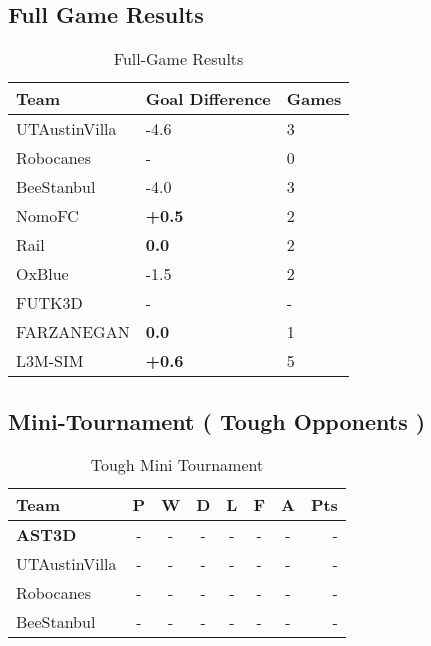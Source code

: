 \subsection{Full Game Results}

\begin{table}
\begin{center}
    \begin{tabular}{ | l | l | l | }
    \hline
    Team & Goal Difference & Games   \\ \hline
    UTAustinVilla 	& -4.6 					& 3 			\\ \hline	
    Robocanes 		& -						& 0 			\\ \hline
    BeeStanbul		& -4.0					& 3				\\ \hline
    NomoFC 			& \textbf{+0.5} 		& 2 			\\ \hline
    Rail 			& \textbf{0.0} 			& 2 			\\ \hline
    OxBlue 			& -1.5 					& 2 			\\ \hline
    FUTK3D 			& - 					& - 			\\ \hline
    FARZANEGAN 		& \textbf{0.0} 			& 1 			\\ \hline
    L3M-SIM			& \textbf{+0.6} 		& 5 			\\     
    \hline
    \end{tabular}
\end{center}
\label{GameResults}
\caption{Full-Game Results}
\end{table}

\subsection{Mini-Tournament ( Tough Opponents )}
\begin{table}
\begin{center}
\begin{tabular}{l*{6}{c}r}
Team              & P & W & D & L & F  & A & Pts \\ \hline
\textbf{AST3D} 	  & - & - & - & - & -  & - & -  \\
UTAustinVilla     & - & - & - & - &  - & - & -  \\
Robocanes         & - & - & - & - &  - & - & -  \\
BeeStanbul     	  & - & - & - & - &  - & - & -  \\
\end{tabular}
\end{center}
\label{ToughTournament}
\caption{Tough Mini Tournament}
\end{table}

